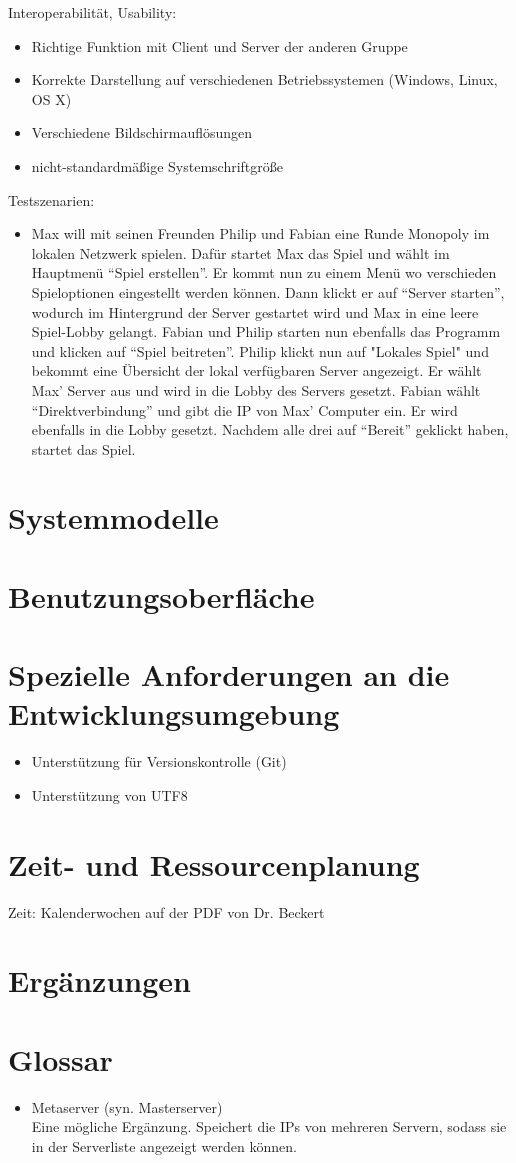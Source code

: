 \documentclass[a4paper,10pt]{article}
\begin{document}
Interoperabilität, Usability:
\begin{itemize}
\item Richtige Funktion mit Client und Server der anderen Gruppe
\item Korrekte Darstellung auf verschiedenen Betriebssystemen (Windows, Linux, OS X)
\item Verschiedene Bildschirmauflösungen
\item nicht-standardmäßige Systemschriftgröße
\end{itemize}
Testszenarien:
\begin{itemize}
\item Max will mit seinen Freunden Philip und Fabian eine Runde Monopoly im lokalen Netzwerk spielen. Dafür startet Max das Spiel und wählt im Hauptmenü ``Spiel erstellen''. Er kommt nun zu einem Menü wo verschieden Spieloptionen eingestellt werden können. Dann klickt er auf ``Server starten'', wodurch im Hintergrund der Server gestartet wird und Max in eine leere Spiel-Lobby gelangt. Fabian und Philip starten nun ebenfalls das Programm und klicken auf ``Spiel beitreten''. Philip klickt nun auf "Lokales Spiel" und bekommt eine Übersicht der lokal verfügbaren Server angezeigt. Er wählt Max' Server aus und wird in die Lobby des Servers gesetzt.
Fabian wählt ``Direktverbindung'' und gibt die IP von Max' Computer ein. Er wird ebenfalls in die Lobby gesetzt. Nachdem alle drei auf ``Bereit'' geklickt haben, startet das Spiel.
\end{itemize}
\section{Systemmodelle}
\section{Benutzungsoberfläche}
\section{Spezielle Anforderungen an die Entwicklungsumgebung}
\begin{itemize}
\item Unterstützung für Versionskontrolle (Git)
\item Unterstützung von UTF8
\end{itemize}
\section{Zeit- und Ressourcenplanung}
Zeit: Kalenderwochen auf der PDF von Dr. Beckert
\section{Ergänzungen}
\section{Glossar}
\begin{itemize}
\item Metaserver (syn. Masterserver) \\
Eine mögliche Ergänzung. Speichert die IPs von mehreren Servern, sodass sie in der Serverliste angezeigt werden können.
\end{itemize}
\end{document}
